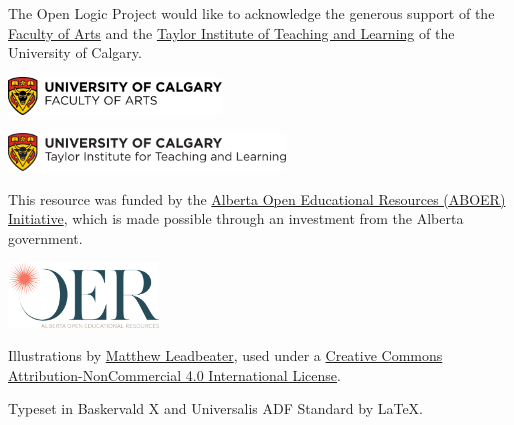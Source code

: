 \newpage


\noindent
The Open Logic Project would like to acknowledge the generous support
of the \href{http://arts.ucalgary.ca/}{Faculty of Arts} and
the \href{http://www.ucalgary.ca/taylorinstitute/}{Taylor Institute of
Teaching and Learning} of the University of Calgary.

\bigskip

\noindent\includegraphics[height=1cm]{ucarts-color}

\medskip

\noindent\includegraphics[height=1cm]{ti-color}

\bigskip\noindent
This resource was funded by the \href{http://albertaoer.com}{Alberta
Open Educational Resources (ABOER) Initiative}, which is made possible
through an investment from the Alberta government.

\noindent\includegraphics[width=4cm]{aboer-color}

\vfill


\noindent Illustrations by \href{http://mattleadbeater.com}{Matthew
  Leadbeater}, used under a
\href{http://creativecommons.org/licenses/by-nc/4.0/}{Creative Commons
  Attribution-NonCommercial 4.0 International License}.

\vfill

\noindent Typeset in Baskervald X and Universalis ADF Standard by
\LaTeX.

\vfill


\renewcommand{\ollicensefont}{\fontsize{9pt}{12pt}\selectfont}

